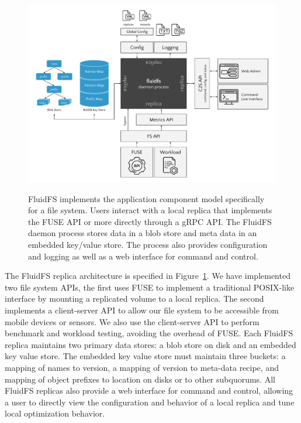 \begin{figure}
    \begin{center}
        \includegraphics[width=\linewidth]{figures/ch05_fluidfs_replica.pdf}
    \end{center}
    \renewcommand{\baselinestretch}{1}
    \small\normalsize

    \begin{quote}
        \caption[FluidFS Architecture]{FluidFS implements the application component model specifically for a file system. Users interact with a local replica that implements the FUSE API or more directly through a gRPC API. The FluidFS daemon process stores data in a blob store and meta data in an embedded key/value store. The process also provides configuration and logging as well as a web interface for command and control.}
        \label{fig:ch05_fluidfs_replica}
    \end{quote}
\end{figure}
\renewcommand{\baselinestretch}{2}
\small\normalsize

The FluidFS replica architecture is specified in Figure~\ref{fig:ch05_fluidfs_replica}.
We have implemented two file system APIs, the first uses FUSE to implement a traditional POSIX-like interface by mounting a replicated volume to a local replica.
The second implements a client-server API to allow our file system to be accessible from mobile devices or sensors.
We also use the client-server API to perform benchmark and workload testing, avoiding the overhead of FUSE.
Each FluidFS replica maintains two primary data stores: a blob store on disk and an embedded key value store.
The embedded key value store must maintain three buckets: a mapping of names to version, a mapping of version to meta-data recipe, and mapping of object prefixes to location on disks or to other subquorums.
All FluidFS replicas also provide a web interface for command and control, allowing a user to directly view the configuration and behavior of a local replica and tune local optimization behavior.


